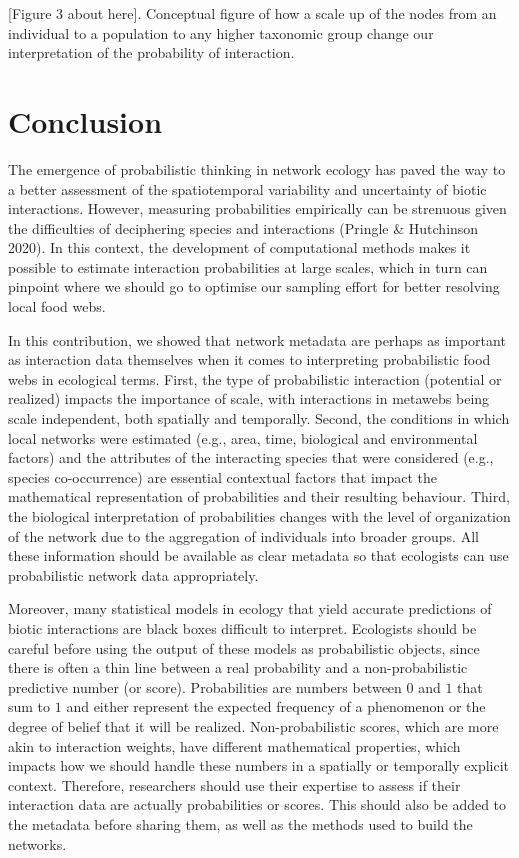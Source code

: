 \documentclass[11pt]{article}
\begin{document}
{[}Figure 3 about here{]}. Conceptual figure of how a scale up of the
nodes from an individual to a population to any higher taxonomic group
change our interpretation of the probability of interaction.

\hypertarget{conclusion}{%
\section{Conclusion}\label{conclusion}}

The emergence of probabilistic thinking in network ecology has paved the
way to a better assessment of the spatiotemporal variability and
uncertainty of biotic interactions. However, measuring probabilities
empirically can be strenuous given the difficulties of deciphering
species and interactions (Pringle \& Hutchinson 2020). In this context,
the development of computational methods makes it possible to estimate
interaction probabilities at large scales, which in turn can pinpoint
where we should go to optimise our sampling effort for better resolving
local food webs.

In this contribution, we showed that network metadata are perhaps as
important as interaction data themselves when it comes to interpreting
probabilistic food webs in ecological terms. First, the type of
probabilistic interaction (potential or realized) impacts the importance
of scale, with interactions in metawebs being scale independent, both
spatially and temporally. Second, the conditions in which local networks
were estimated (e.g., area, time, biological and environmental factors)
and the attributes of the interacting species that were considered
(e.g., species co-occurrence) are essential contextual factors that
impact the mathematical representation of probabilities and their
resulting behaviour. Third, the biological interpretation of
probabilities changes with the level of organization of the network due
to the aggregation of individuals into broader groups. All these
information should be available as clear metadata so that ecologists can
use probabilistic network data appropriately.

Moreover, many statistical models in ecology that yield accurate
predictions of biotic interactions are black boxes difficult to
interpret. Ecologists should be careful before using the output of these
models as probabilistic objects, since there is often a thin line
between a real probability and a non-probabilistic predictive number (or
score). Probabilities are numbers between \(0\) and \(1\) that sum to
\(1\) and either represent the expected frequency of a phenomenon or the
degree of belief that it will be realized. Non-probabilistic scores,
which are more akin to interaction weights, have different mathematical
properties, which impacts how we should handle these numbers in a
spatially or temporally explicit context. Therefore, researchers should
use their expertise to assess if their interaction data are actually
probabilities or scores. This should also be added to the metadata
before sharing them, as well as the methods used to build the networks.
\end{document}
